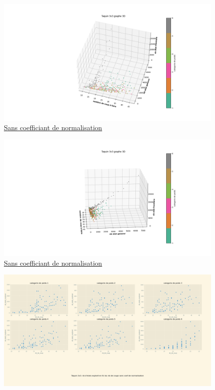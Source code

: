 \documentclass[a4paper, 12pt]{article}
\begin{document}
\begin{figure}[H]
    \centering
    \includegraphics[width=\textwidth]{graphe 3d Taquin 3x3(2)}
    \caption{\underline{Sans coefficiant de normalisation}}
\end{figure}
\begin{figure}[H]
    \centering
    \includegraphics[width=\textwidth]{graphe 3d Taquin 3x3(3)}
    \caption{\underline{Sans coefficiant de normalisation}}
\end{figure}

\begin{figure}[H]
    \centering
    \includegraphics[width=\textwidth]{Taquin 3x3 nombre d'etat explorer en fct du nb de coups sans coef}
\end{figure}
\end{document}
